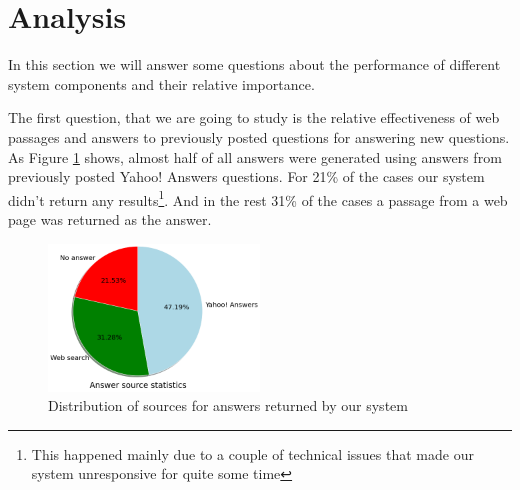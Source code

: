 \documentclass[]{article}
\begin{document}
\section{Analysis}

In this section we will answer some questions about the performance of different system components and their relative importance.

The first question, that we are going to study is the relative effectiveness of web passages and answers to previously posted questions for answering new questions.
As Figure \ref{figure:answer_source_pie} shows, almost half of all answers were generated using answers from previously posted Yahoo! Answers questions.
For 21\% of the cases our system didn't return any results\footnote{This happened mainly due to a couple of technical issues that made our system unresponsive for quite some time}.
And in the rest 31\% of the cases a passage from a web page was returned as the answer.


\begin{figure}
\centering
	\includegraphics[width=0.5\textwidth]{img/answer_source}
	\caption{Distribution of sources for answers returned by our system}
	\label{figure:answer_source_pie}
\end{figure}
\end{document}
